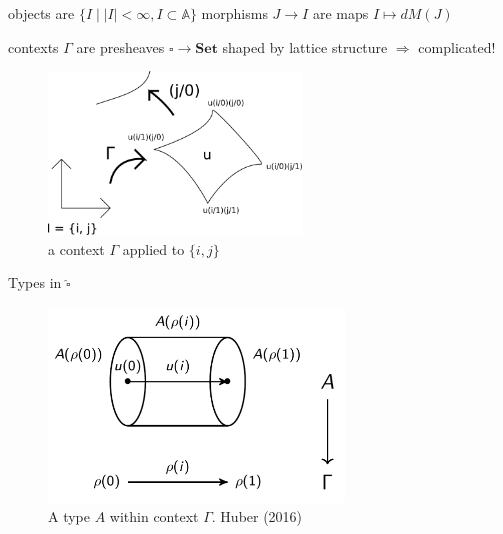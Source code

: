 \documentclass[english,draft]{beamer}
\begin{document}
\begin{frame}
 


 
 \begin{definition}
 
  objects are $\{ I \mid |I| < \infty , I \subset \mathbb{A} \}$
  morphisms $J\rightarrow I$ are maps $I \mapsto dM(J)$ 
 
 \end{definition}
 
  \begin{example}
 contexts $\Gamma$ are presheaves $\square \rightarrow \mathbf{Set}$
 shaped by lattice structure $\Rightarrow$ complicated!
 
 \begin{figure}
 
 \includegraphics[width=0.6\textwidth]{figures/context}
 
  \caption{a context $\Gamma$ applied to $\{i,j\}$}
  \end{figure}
 \end{example}
 
\end{frame}

\begin{frame}{Types in $\widehat{\square}$}
 \begin{figure}
\centering
\includegraphics[width=0.7\textwidth]{figures/types}
\caption{A type $A$ within context $\Gamma$. Huber (2016)}
 \end{figure}
 
\end{frame}
\end{document}
